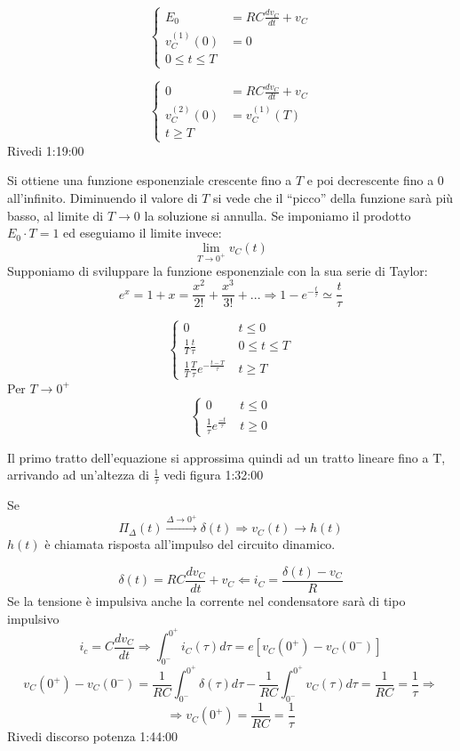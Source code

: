 $$
\begin{cases}
E_0 &= RC\frac{dv_C}{dt} + v_C \\
v_C^{(1)}(0) &= 0 \\
0 \leq t \leq T
\end{cases}
$$

$$
\begin{cases}
0 &= RC\frac{dv_C}{dt} + v_C \\
v_C^{(2)}(0) &= v_C^{(1)}(T) \\
t \geq T
\end{cases}
$$
Rivedi 1:19:00

Si ottiene una funzione esponenziale crescente fino a $T$ e poi decrescente fino a 0 all'infinito.
Diminuendo il valore di $T$ si vede che il ``picco'' della funzione sarà più basso, al limite 
di $T \rightarrow 0$ la soluzione si annulla.
Se imponiamo il prodotto $E_0\cdot T = 1$ ed eseguiamo il limite invece:
$$
\lim_{T\rightarrow0^+} v_C(t)
$$
Supponiamo di sviluppare la funzione esponenziale con la sua serie di Taylor:
$$
e^x = 1 + x =\frac{x^2}{2!} + \frac{x^3}{3!} + ... \Rightarrow 1-e^{-\frac{t}{\tau}} \simeq \frac{t}{\tau} 
$$

$$
\begin{cases}
0\ & t\leq 0 \\
\frac{1}{T}\frac{t}{\tau}\  & 0 \leq t\leq T \\
\frac{1}{T}\frac{T}{\tau} e^{-\frac{t-T}{\tau}}\ & t\geq T
\end{cases}
$$
Per $T\rightarrow 0^+$
$$
\begin{cases}
0\ & t\leq 0\\
\frac{1}{\tau}e^{\frac{-t}{\tau}}\ & t \geq 0
\end{cases}
$$

Il primo tratto dell'equazione si approssima quindi ad un tratto lineare fino a T, arrivando ad 
un'altezza di $\frac{1}{\tau}$ vedi figura 1:32:00

Se 
$$\Pi_\Delta(t) \stackrel{\Delta\rightarrow0^+}{\rightarrow} \delta(t) \Rightarrow v_C(t) \rightarrow h(t)$$
$h(t)$ è chiamata risposta all'impulso del circuito dinamico.

$$
\delta(t) = RC\frac{dv_C}{dt} + v_C \Leftarrow i_C = \frac{\delta(t)-v_C}{R}
$$
Se la tensione è impulsiva anche la corrente nel condensatore sarà di tipo impulsivo
$$
i_c = C\frac{dv_C}{dt} \Rightarrow \int_{0^-}^{0^+} i_C(\tau)d\tau = e[v_C(0^+)-v_C(0^-)]
$$
$$
v_C(0^+) - v_C(0^-) = \frac{1}{RC} \int_{0^-}^{0^+} \delta(\tau)d\tau - \frac{1}{RC} \int_{0^-}^{0^+} v_C(\tau)d\tau = \frac{1}{RC} = \frac{1}{\tau} \Rightarrow 
$$
$$
\Rightarrow v_C(0^+) = \frac{1}{RC} = \frac{1}{\tau}
$$
Rivedi discorso potenza 1:44:00

